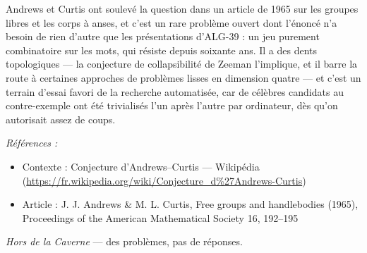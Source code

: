 \documentclass[11pt]{article}
\newenvironment{refs}{\par\small\noindent\emph{Références :}\begin{itemize}\setlength\itemsep{0pt}}{\end{itemize}\normalsize}
\begin{document}
\noindent Andrews et Curtis ont soulevé la question dans un article de 1965 sur les groupes libres
et les corps à anses, et c'est un rare problème ouvert dont l'énoncé n'a besoin de rien d'autre que les
présentations d'ALG-39 : un jeu purement combinatoire sur les mots, qui résiste depuis soixante ans. Il a des
dents topologiques --- la conjecture de collapsibilité de Zeeman l'implique, et il barre la route à certaines
approches de problèmes lisses en dimension quatre --- et c'est un terrain d'essai favori de la recherche
automatisée, car de célèbres candidats au contre-exemple ont été trivialisés l'un après l'autre par
ordinateur, dès qu'on autorisait assez de coups.

\begin{refs}
\item Contexte : Conjecture d'Andrews--Curtis --- Wikipédia (\url{https://fr.wikipedia.org/wiki/Conjecture_d%27Andrews-Curtis})
\item Article : J. J. Andrews \& M. L. Curtis, \og{} Free groups and handlebodies \fg{} (1965), Proceedings of the American Mathematical Society 16, 192--195
\end{refs}

\bigskip


\vfill
\noindent\emph{Hors de la Caverne} --- des probl\`emes, pas de r\'eponses.
\end{document}
